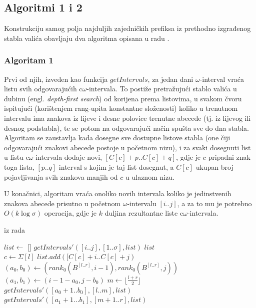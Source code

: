 \documentclass[a4paper,12pt]{article}
\begin{document}
\subsection{Algoritmi 1 i 2}

Konstrukciju samog polja najduljih zajedničkih prefiksa iz prethodno izgrađenog stabla valića obavljaju dva algoritma opisana u radu \cite{beller2013}.

\subsubsection{Algoritam 1}

Prvi od njih, izveden kao funkcija $getIntervals$, za jedan dani $\omega$-interval vraća listu svih odgovarajućih c$\omega$-intervala. To postiže pretražujući stablo valića u dubinu (engl. \textit{depth-first search}) od korijena prema listovima, u svakom čvoru ispitujući (korištenjem rang-upita konstantne složenosti) koliko u trenutnom intervalu ima znakova iz lijeve i desne polovice trenutne abecede (tj. iz lijevog ili desnog podstabla), te se potom na odgovarajući način spušta sve do dna stabla. Algoritam se zaustavlja kada dosegne sve dostupne listove stabla (one čiji odgovarajući znakovi abecede postoje u početnom nizu), i za svaki dosegnuti list u listu c$\omega$-intervala dodaje novi, ${[C[c]+p..C[c]+q]}$, gdje je $c$ pripadni znak toga lista, ${[p..q]}$ interval s kojim je taj list dosegnut, a $C[c]$ ukupan broj pojavljivanja svih znakova manjih od $c$ u ulaznom nizu.

U konačnici, algoritam vraća onoliko novih intervala koliko je jedinstvenih znakova abecede prisutno u početnom $\omega$-intervalu $[i..j]$, a za to mu je potrebno $O(k\log\sigma)$ operacija, gdje je $k$ duljina rezultantne liste c$\omega$-intervala.

\begin{algorithm}[H]
	\caption{iz rada \cite{beller2013}}
	\label{alg1}
	\begin{algorithmic}
			\State $list \gets$ []
			\State $getIntervals'([i..j],[1..\sigma],list)$
			\State \Return $list$
		\EndFunction\\

				\State $c \gets \Sigma[l]$
				\State $list.add([C[c]+i..C[c]+j)$
			\Else
				\State $(a_0,b_0) \gets (rank_0(B^{[l..r]},i-1),rank_0(B^{[l..r]},j))$
				\State $(a_1,b_1) \gets (i-1-a_0,j-b_0)$
				\State $m \gets \lfloor\frac{l+r}{2}\rfloor$
					\State $getIntervals'([a_0+1..b_0],[l..m],list)$
				\EndIf
					\State $getIntervals'([a_1+1...b_1],[m+1..r],list)$
				\EndIf
			\EndIf
		\EndFunction
	\end{algorithmic}
\end{algorithm}
\end{document}
